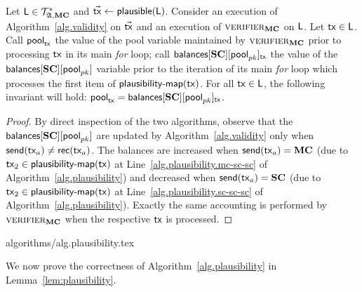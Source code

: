 \begin{lemma}\label{lem:plausible-balances}
  Let $\mathsf{L} \in \mathcal{T}_{\mathfrak{A},\mathbf{MC}}^*$ and $\vec{\mathsf{tx}} \gets \textsf{plausible}(\mathsf{L})$.
  Consider an execution of
  Algorithm~\ref{alg.validity} on $\vec{\mathsf{tx}}$ and an execution of
  $\textsc{verifier}_{\mathbf{MC}}$ on $\mathsf{L}$. Let $\mathsf{tx} \in \mathsf{L}$. Call
  $\textsf{pool}_{\mathsf{tx}}$ the value of the \textsf{pool} variable maintained by
  $\textsc{verifier}_{\mathbf{MC}}$ prior to processing $\mathsf{tx}$ in its
  main \emph{for} loop; call
  $\textsf{balances}[\mathbf{SC}][\textsf{pool}_{pk}]_{\mathsf{tx}}$ the value of the
  $\textsf{balances}[\mathbf{SC}][\textsf{pool}_{pk}]$ variable prior to the iteration
  of its main \emph{for} loop which processes the first item of
  $\textsf{plausibility-map}(\mathsf{tx})$. For all $\mathsf{tx} \in \mathsf{L}$, the following
  invariant will hold: $\textsf{pool}_{\mathsf{tx}} =
  \textsf{balances}[\mathbf{SC}][\textsf{pool}_{pk}]_{\mathsf{tx}}$.
\end{lemma}

\begin{proof}
  By direct inspection of the two algorithms, observe that the
  $\textsf{balances}[\mathbf{SC}][\textsf{pool}_{pk}]$ are updated by
  Algorithm~\ref{alg.validity} only when $\mathsf{send}(\mathsf{tx}_a) \neq \mathsf{rec}(\mathsf{tx}_a)$. The
  balances are increased when $\mathsf{send}(\mathsf{tx}_a) = \mathbf{MC}$ (due to $\mathsf{tx}_2 \in
  \textsf{plausibility-map}(\mathsf{tx})$ at Line~\ref{alg.plausibility.mc-sc-sc} of
  Algorithm~\ref{alg.plausibility}) and decreased when $\mathsf{send}(\mathsf{tx}_a) = \mathbf{SC}$ (due
  to $\mathsf{tx}_2 \in \textsf{plausibility-map}(\mathsf{tx})$ at
  Line~\ref{alg.plausibility.sc-sc-sc} of Algorithm~\ref{alg.plausibility}).
  Exactly the same accounting is performed by $\textsc{verifier}_{\mathbf{MC}}$ when the
  respective $\mathsf{tx}$ is processed.
\end{proof}

{algorithms/alg.plausibility.tex}

We now prove the correctness of Algorithm~\ref{alg.plausibility} in
Lemma~\ref{lem:plausibility}.


